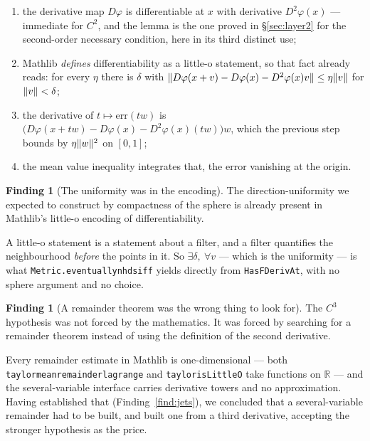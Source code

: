 \documentclass[11pt,reqno]{amsart}
\newcommand{\LEANREF}[1]{\texttt{\small\def\_{\textunderscore\allowbreak}#1}}
\newcommand{\R}{\mathbb{R}}
\DeclarePairedDelimiter{\norm}{\lVert}{\rVert}
\theoremstyle{plain}
\theoremstyle{definition}
\newtheorem{finding}[theorem]{Finding}
\begin{document}
\begin{enumerate}
  \item the derivative map $D\varphi$ is differentiable at $x$ with derivative
        $D^2\varphi(x)$ --- immediate for $C^2$, and the lemma is the one
        proved in \S\ref{sec:layer2} for the second-order necessary condition,
        here in its third distinct use;
  \item Mathlib \emph{defines} differentiability as a little-o statement, so
        that fact already reads: for every $\eta$ there is $\delta$ with
        $\norm{D\varphi(x+v) - D\varphi(x) - D^2\varphi(x)v} \le \eta\norm{v}$
        for $\norm{v} < \delta$;
  \item the derivative of $t \mapsto \mathrm{err}(tw)$ is
        $\bigl(D\varphi(x+tw) - D\varphi(x) - D^2\varphi(x)(tw)\bigr)w$, which
        the previous step bounds by $\eta\norm{w}^2$ on $[0,1]$;
  \item the mean value inequality integrates that, the error vanishing at the
        origin.
\end{enumerate}

\begin{finding}[The uniformity was in the encoding]\label{find:littleo}
The direction-uniformity we expected to construct by compactness of the sphere
is already present in Mathlib's little-o encoding of differentiability.
\end{finding}

A little-o statement is a statement about a filter, and a filter quantifies the
neighbourhood \emph{before} the points in it. So
$\exists \delta,\ \forall v$ --- which is the uniformity --- is what
\LEANREF{Metric.eventually\_nhds\_iff} yields directly from
\LEANREF{HasFDerivAt}, with no sphere argument and no choice.

\begin{finding}[A remainder theorem was the wrong thing to look
for]\label{find:wrongsearch}
The $C^3$ hypothesis was not forced by the mathematics. It was forced by
searching for a remainder theorem instead of using the definition of the second
derivative.
\end{finding}

Every remainder estimate in Mathlib is one-dimensional --- both
\LEANREF{taylor\_mean\_remainder\_lagrange} and \LEANREF{taylor\_isLittleO}
take functions on $\R$ --- and the several-variable interface carries
derivative towers and no approximation. Having established that
(Finding~\ref{find:jets}), we concluded that a several-variable remainder had
to be built, and built one from a third derivative, accepting the stronger
hypothesis as the price.
\end{document}
